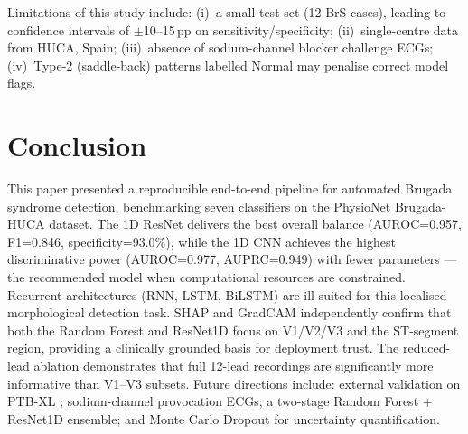 \documentclass[journal, 10pt, twoside]{IEEEtran}
\begin{document}
Limitations of this study include:
(i)~a small test set (12 BrS cases), leading to confidence intervals
of $\pm$10--15\,pp on sensitivity/specificity;
(ii)~single-centre data from HUCA, Spain;
(iii)~absence of sodium-channel blocker challenge ECGs;
(iv)~Type-2 (saddle-back) patterns labelled Normal may penalise
correct model flags.

\section{Conclusion}
\label{sec:conclusion}

This paper presented a reproducible end-to-end pipeline for automated
Brugada syndrome detection, benchmarking seven classifiers on the
PhysioNet Brugada-HUCA dataset.
The 1D ResNet delivers the best overall balance
(AUROC=0.957, F1=0.846, specificity=93.0\%), while the 1D CNN
achieves the highest discriminative power (AUROC=0.977, AUPRC=0.949)
with fewer parameters — the recommended model when computational
resources are constrained.
Recurrent architectures (RNN, LSTM, BiLSTM) are ill-suited for this
localised morphological detection task.
SHAP and GradCAM independently confirm that both the Random Forest
and ResNet1D focus on V1/V2/V3 and the ST-segment region, providing
a clinically grounded basis for deployment trust.
The reduced-lead ablation demonstrates that full 12-lead recordings
are significantly more informative than V1--V3 subsets.
Future directions include: external validation on PTB-XL
\cite{wagner2020ptb}; sodium-channel provocation ECGs;
a two-stage Random Forest + ResNet1D ensemble; and Monte Carlo
Dropout \cite{gal2016dropout} for uncertainty quantification.
\end{document}
